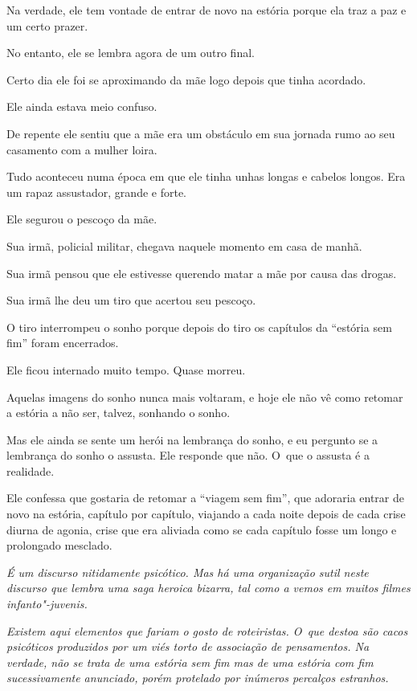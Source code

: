Na verdade, ele tem vontade de entrar de novo na estória porque ela traz
a paz e um certo prazer.

No entanto, ele se lembra agora de um outro final.

Certo dia ele foi se aproximando da mãe logo depois que tinha acordado.

Ele ainda estava meio confuso.

De repente ele sentiu que a mãe era um obstáculo em sua jornada rumo ao
seu casamento com a mulher loira.

Tudo aconteceu numa época em que ele tinha unhas longas e cabelos
longos. Era um rapaz assustador, grande e forte.

Ele segurou o pescoço da mãe.

Sua irmã, policial militar, chegava naquele momento em casa de manhã.

Sua irmã pensou que ele estivesse querendo matar a mãe por causa das
drogas.

Sua irmã lhe deu um tiro que acertou seu pescoço.

O tiro interrompeu o sonho porque depois do tiro os capítulos da
``estória sem fim'' foram encerrados.

Ele ficou internado muito tempo. Quase morreu.

Aquelas imagens do sonho nunca mais voltaram, e hoje ele não vê como
retomar a estória a não ser, talvez, sonhando o sonho.

Mas ele ainda se sente um herói na lembrança do sonho, e eu pergunto se
a lembrança do sonho o assusta. Ele responde que não. O~que o assusta é
a realidade.

Ele confessa que gostaria de retomar a ``viagem sem fim'', que adoraria
entrar de novo na estória, capítulo por capítulo, viajando a cada noite
depois de cada crise diurna de agonia, crise que era aliviada como se
cada capítulo fosse um longo e prolongado mesclado. ~{}~

\begin{center}\asterisc{}\end{center}


\emph{É um discurso nitidamente psicótico. Mas há uma organização sutil
neste discurso que lembra uma saga heroica bizarra, tal como a vemos em
muitos filmes infanto"-juvenis.}~

\emph{Existem aqui elementos que fariam o gosto de roteiristas. O~que
destoa são cacos psicóticos produzidos por um viés torto de associação
de pensamentos. Na verdade, não se trata de uma estória sem fim mas de
uma estória com fim sucessivamente anunciado, porém protelado por
inúmeros percalços estranhos.}~

